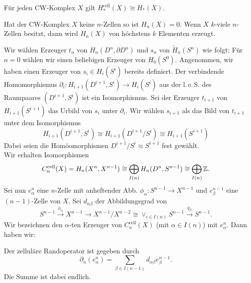 \documentclass{cheat-sheet}
\newcommand{\RH}{\tilde{H}} %
\begin{document}
\begin{prop}
  Für jeden CW-Komplex $X$ gilt $H_*^\text{cell}(X) \cong H_*(X)$.
\end{prop}

\begin{kor}
  Hat der CW-Komplex $X$ keine $n$-Zellen so ist $H_n(X) = 0$. Wenn $X$ $k$-viele $n$-Zellen besitzt, dann wird $H_n(X)$ von höchstens $k$ Elementen erzeugt.
\end{kor}

\begin{bem}
  Wir wählen Erzeuger $t_n$ von $H_n(D^n, \partial D^n)$ und $s_n$ von $\RH_n(S^n)$ wie folgt:
  Für $n=0$ wählen wir einen beliebigen Erzeuger von $H_0(S^0)$. Angenommen, wir haben einen Erzeuger von $s_i \in H_i(S^i)$ bereits definiert. Der verbindende Homomorphismus $\partial_i : H_{i+1}(D^{i+1}, S^i) \to H_i(S^i)$ aus der l.\,e.\,S. des Raumpaares $(D^{i+1}, S^i)$ ist ein Isomorphismus. Sei der Erzeuger $t_{i+1}$ von $H_{i+1}(S^{i+1})$ das Urbild von $s_i$ unter $\partial_i$. Wir wählen $s_{i+1}$ als das Bild von $t_{i+1}$ unter dem Isomorphismus
  \[ H_{i+1}(D^{i+1}, S^i) \cong H_{i+1}(D^{i+1}/S^i) \cong H_{i+1}(S^{i+1}) \]
  Dabei seien die Homöomorphismen $D^{i+1}/S^i \approx S^{i+1}$ fest gewählt.\\
  Wir erhalten Isomorphismen
  \[ C^{\text{cell}}_n(X) = H_n(X^n, X^{n-1}) \cong \bigoplus_{I(n)} H_n(D^n, S^{n-1}) \cong \bigoplus_{I(n)} \mathbb{Z}. \]
  Sei nun $e^n_\alpha$ eine $n$-Zelle mit anheftender Abb. $\phi_\alpha : S^{n-1} \to X^{n-1}$ und $e^{n-1}_\beta$ eine $(n{-}1)$-Zelle von $X$. Sei $d_{\alpha \beta}$ der Abbildungsgrad von
  \[ S^{n-1} \xrightarrow{\phi_\alpha} X^{n-1} \to X^{n-1} / X^{n-2} \cong \vee_{i \in I(n)} S^{n-1} \xrightarrow{q_\beta} S^{n-1}. \]
  Wir bezeichnen den $\alpha$-ten Erzeuger von $C^{\text{cell}}_n(X)$ (mit $\alpha \in I(n)$) mit $e^n_\alpha$. Dann haben wir:
\end{bem}

\begin{prop}
  Der zelluläre Randoperator ist gegeben durch
  \[ \partial_n(e^n_\alpha) = \sum_{\beta \in I(n-1)} d_{\alpha \beta} e^{n-1}_\beta. \]
  Die Summe ist dabei endlich.
\end{prop}


\end{document}
